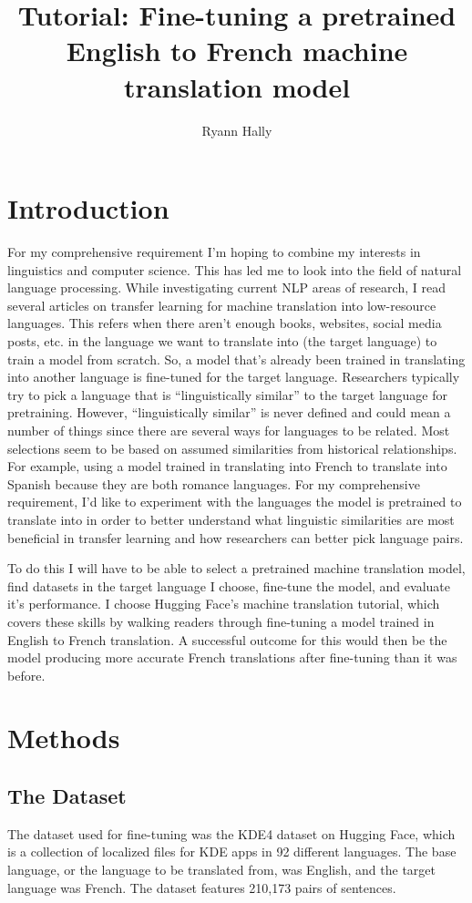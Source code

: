 \documentclass[10pt,twocolumn]{article}
\title{Tutorial: Fine-tuning a pretrained English to French machine translation model}
\author{Ryann Hally}
\affiliation{Occidental College}
\begin{document}
\maketitle
\section{Introduction}
For my comprehensive requirement I’m hoping to combine my interests in linguistics and computer science. This has led me to look into the field of natural language processing. While investigating current NLP areas of research, I read several articles on transfer learning for machine translation into low-resource languages. This refers when there aren't enough books, websites, social media posts, etc. in the language we want to translate into (the target language) to train a model from scratch. So, a model that's already been trained in translating into another language is fine-tuned for the target language. Researchers typically try to pick a language that is “linguistically similar” to the target language for pretraining. However, “linguistically similar” is never defined and could mean a number of things since there are several ways for languages to be related. Most selections seem to be based on assumed similarities from historical relationships. For example, using a model trained in translating into French to translate into Spanish because they are both romance languages. For my comprehensive requirement, I'd like to experiment with the languages the model is pretrained to translate into in order to better understand what linguistic similarities are most beneficial in transfer learning and how researchers can better pick language pairs.

To do this I will have to be able to select a pretrained machine translation model, find datasets in the target language I choose, fine-tune the model, and evaluate it's performance. I choose Hugging Face's machine translation tutorial, which covers these skills by walking readers through fine-tuning a model trained in English to French translation. 
A successful outcome for this would then be the model producing more accurate French translations after fine-tuning than it was before.


\section{Methods}

\subsection{The Dataset}
The dataset used for fine-tuning was the KDE4 dataset on Hugging Face, which is a collection of localized files for KDE apps in 92 different languages. The base language, or the language to be translated from, was English, and the target language was French. The dataset features 210,173 pairs of sentences.
\end{document}
